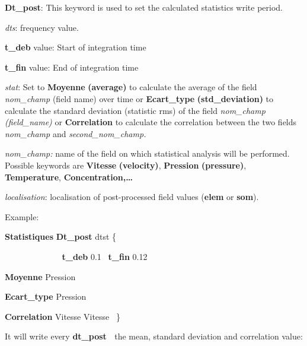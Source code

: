 


\textbf{Dt\_post}: This keyword is used to set the calculated statistics write period.

\textit{dts}: frequency value.

\textbf{t\_deb} value: Start of integration time

\textbf{t\_fin} value: End of integration time


\bigskip

\textit{stat}: Set to \textbf{Moyenne}\textbf{ (average)} to calculate the average of the field
\textit{nom\_champ} (field name) over time or \textbf{Ecart\_type}\textbf{
(std\_deviation)} to calculate the standard deviation (statistic rms) of the field \textit{nom\_champ (field\_name)} or
\textbf{Correlation} to calculate the correlation between the two fields \textit{nom\_champ
}and\textit{ second\_nom\_champ.}


\bigskip

\textit{nom\_champ:} name of the field on which statistical analysis will be performed. Possible keywords are
\textbf{Vitesse}\textbf{ (velocity)}, \textbf{Pression}\textbf{ (pressure)},
\textbf{Temperature}, \textbf{Concentration}\textbf{,{\dots}}


\bigskip

\textit{localisation}: localisation of post-processed field values (\textbf{elem} or \textbf{som}).


\bigskip

Example:

\textbf{Statistiques}\textbf{ Dt\_post}\textbf{ }dtst \{

\textbf{\ \ \ \ \ \ \ \ \ \ \ \ t\_deb} 0.1 \ \textbf{t\_fin} 0.12

\textbf{Moyenne} Pression

\textbf{Ecart\_type}\textbf{ }Pression 

\textbf{Correlation}\textbf{ }Vitesse Vitesse \ \}

It will write every \textbf{dt\_post \ }the mean, standard deviation and correlation value:

